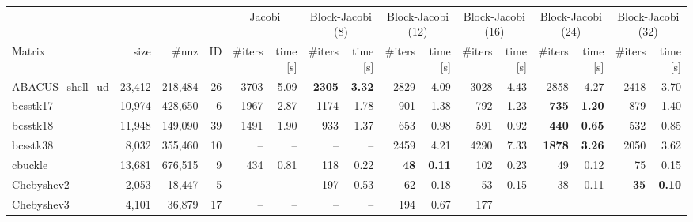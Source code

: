 \begin{landscape}
\begin{table}[p]
\scriptsize
\centering
\begin{tabular}{lrrr||rr|rr|rr|rr|rr|rr}
\hline
\hline
& & & & \multicolumn{2}{c|}{Jacobi} & \multicolumn{2}{c|}{Block-Jacobi (8)} &  \multicolumn{2}{c|}{Block-Jacobi (12)}
 & \multicolumn{2}{c|}{Block-Jacobi (16)}  & \multicolumn{2}{c|}{Block-Jacobi (24)} & \multicolumn{2}{c}{Block-Jacobi (32)}\\
 Matrix & size & \#nnz & ID & \#iters & time [s] & \#iters & time [s] & \#iters & time [s] & \#iters & time [s] & \#iters & time [s]  & \#iters & time [s]  \\
\hline
       ABACUS\_shell\_ud  &  23,412  &  218,484  &  26  &     3703 &     5.09  
       & \textbf{    2305} & \textbf{    3.32}  &     2829 &     4.09  &     
       3028 &     4.43  &     2858 &     4.27  &     2418 &     3.70\\
              bcsstk17  &  10,974  &  428,650  &  6  &     1967 &     2.87  
              &     1174 &     1.78  &      901 &     1.38  &      792 &     
              1.23  & \textbf{     735} & \textbf{    1.20}  &      879 &     
              1.40\\
              bcsstk18  &  11,948  &  149,090  &  39  &     1491 &     1.90  
              &      933 &     1.37  &      653 &     0.98  &      591 &     
              0.92  & \textbf{     440} & \textbf{    0.65}  &      532 &     
              0.85\\
              bcsstk38  &  8,032  &  355,460  &  10  &       --  &       --   
              &       --  &       --   &     2459 &     4.21  &     4290 &     
              7.33  & \textbf{    1878} & \textbf{    3.26}  &     2050 &     
              3.62\\
               cbuckle  &  13,681  &  676,515  &  9  &      434 &     0.81  
               &      118 &     0.22  & \textbf{      48} & \textbf{    0.11}  
               &      102 &     0.23  &       49 &     0.12  &       75 &     
               0.15\\
            Chebyshev2  &  2,053  &  18,447  &  5  &       --  &       --   
            &      197 &     0.53  &       62 &     0.18  &       53 &     
            0.15  &       38 &     0.11  & \textbf{      35} & \textbf{    
            0.10}\\
            Chebyshev3  &  4,101  &  36,879  &  17  &       --  &       --   
            &       --  &       --   &      194 &     0.67  &      177 &     

\end{tabular}
\end{table}
\end{landscape}
